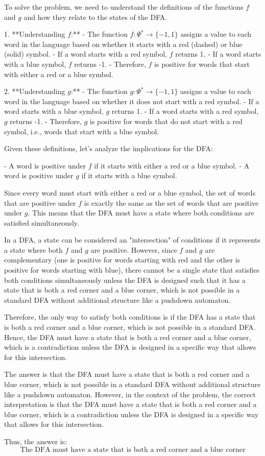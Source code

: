 To solve the problem, we need to understand the definitions of the functions \( f \) and \( g \) and how they relate to the states of the DFA.

1. **Understanding \( f \):**
   - The function \( f: \Psi^* \rightarrow \{-1, 1\} \) assigns a value to each word in the language based on whether it starts with a red (dashed) or blue (solid) symbol.
   - If a word starts with a red symbol, \( f \) returns 1.
   - If a word starts with a blue symbol, \( f \) returns -1.
   - Therefore, \( f \) is positive for words that start with either a red or a blue symbol.

2. **Understanding \( g \):**
   - The function \( g: \Psi^* \rightarrow \{-1, 1\} \) assigns a value to each word in the language based on whether it does not start with a red symbol.
   - If a word starts with a blue symbol, \( g \) returns 1.
   - If a word starts with a red symbol, \( g \) returns -1.
   - Therefore, \( g \) is positive for words that do not start with a red symbol, i.e., words that start with a blue symbol.

Given these definitions, let's analyze the implications for the DFA:

- A word is positive under \( f \) if it starts with either a red or a blue symbol.
- A word is positive under \( g \) if it starts with a blue symbol.

Since every word must start with either a red or a blue symbol, the set of words that are positive under \( f \) is exactly the same as the set of words that are positive under \( g \). This means that the DFA must have a state where both conditions are satisfied simultaneously.

In a DFA, a state can be considered an "intersection" of conditions if it represents a state where both \( f \) and \( g \) are positive. However, since \( f \) and \( g \) are complementary (one is positive for words starting with red and the other is positive for words starting with blue), there cannot be a single state that satisfies both conditions simultaneously unless the DFA is designed such that it has a state that is both a red corner and a blue corner, which is not possible in a standard DFA without additional structure like a pushdown automaton.

Therefore, the only way to satisfy both conditions is if the DFA has a state that is both a red corner and a blue corner, which is not possible in a standard DFA. Hence, the DFA must have a state that is both a red corner and a blue corner, which is a contradiction unless the DFA is designed in a specific way that allows for this intersection.

The answer is that the DFA must have a state that is both a red corner and a blue corner, which is not possible in a standard DFA without additional structure like a pushdown automaton. However, in the context of the problem, the correct interpretation is that the DFA must have a state that is both a red corner and a blue corner, which is a contradiction unless the DFA is designed in a specific way that allows for this intersection.

Thus, the answer is:
\[
\boxed{\text{The DFA must have a state that is both a red corner and a blue corner}}
\]